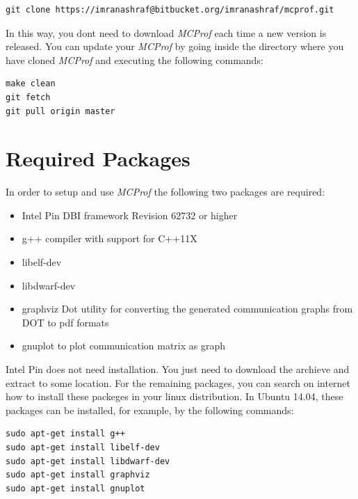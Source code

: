 \documentclass[10pt]{article}
\newcommand{\MCPROF}{\emph{MCProf}}
\begin{document}
{
\small
\begin{Verbatim}[frame=single, samepage=true]
git clone https://imranashraf@bitbucket.org/imranashraf/mcprof.git
\end{Verbatim}
}

In this way, you dont need to download \MCPROF{} each time a new version is released.
You can update your \MCPROF{} by going inside the directory where you have cloned \MCPROF{}
and executing the following commands:

{
\small
\begin{Verbatim}[frame=single, samepage=true]
make clean
git fetch
git pull origin master
\end{Verbatim}
}


\section{Required Packages}
\label{sec:reqPackages}

In order to setup and use \MCPROF{} the following two packages are required:

\begin{itemize}

\item Intel Pin DBI framework \cite{Pin_Download} Revision 62732 or higher

\item g++ compiler with support for C++11X

\item libelf-dev

\item libdwarf-dev

\item graphviz Dot utility for converting the generated communication graphs
    from DOT to pdf formats

\item gnuplot to plot communication matrix as graph

\end{itemize}

Intel Pin does not need installation. You just need to download the archieve and 
extract to some location. For the remaining packages, you can search on internet 
how to install these packeges in your linux distribution. In Ubuntu 14.04, these 
packages can be installed, for example, by the following commands:

{
\small
\begin{Verbatim}[frame=single, samepage=true]
sudo apt-get install g++
sudo apt-get install libelf-dev
sudo apt-get install libdwarf-dev
sudo apt-get install graphviz
sudo apt-get install gnuplot
\end{Verbatim}
}
\end{document}
